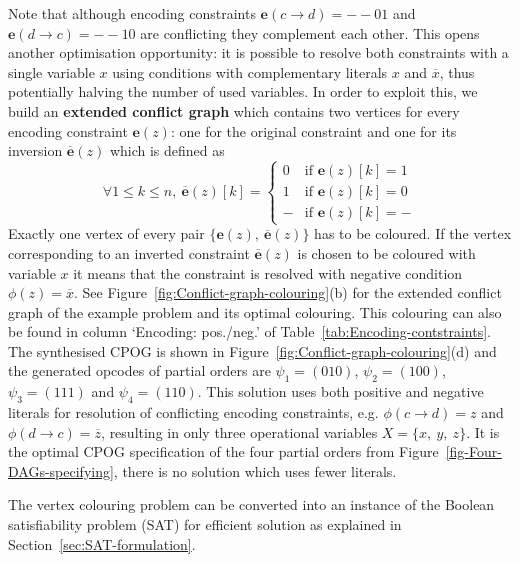 Note that although encoding constraints $\mathbf{e}(c\rightarrow d)=-\!-\!01$
and $\mathbf{e}(d\rightarrow c)=-\!-\!10$ are conflicting they complement
each other. This opens another optimisation opportunity: it is possible
to resolve both constraints with a single variable $x$ using conditions
with complementary literals $x$ and $\overline{x}$, thus potentially
halving the number of used variables. In order to exploit this, we
build an \textbf{extended conflict graph} which contains two vertices
for every encoding constraint $\mathbf{e}(z)$: one for the original
constraint and one for its inversion $\overline{\mathbf{e}}(z)$ which
is defined as
\[
\forall1\le k\le n,\ \overline{\mathbf{e}}(z)[k]=\begin{cases}
0 & \text{if }\mathbf{e}(z)[k]=1\\
1 & \text{if }\mathbf{e}(z)[k]=0\\
- & \text{if }\mathbf{e}(z)[k]=-
\end{cases}
\]
Exactly one vertex of every pair $\{\mathbf{e}(z),\ \overline{\mathbf{e}}(z)\}$
has to be coloured. If the vertex corresponding to an inverted constraint
$\overline{\mathbf{e}}(z)$ is chosen to be coloured with variable
$x$ it means that the constraint is resolved with negative condition
$\phi(z)=\overline{x}$. See Figure~\ref{fig:Conflict-graph-colouring}(b)
for the extended conflict graph of the example problem and its optimal
colouring. This colouring can also be found in column `Encoding:
pos./neg.' of Table~\ref{tab:Encoding-contstraints}. The synthesised
CPOG is shown in Figure~\ref{fig:Conflict-graph-colouring}(d) and
the generated opcodes of partial orders are $\psi_{1}=(010)$, $\psi_{2}=(100)$,
$\psi_{3}=(111)$ and $\psi_{4}=(110)$. This solution uses both positive
and negative literals for resolution of conflicting encoding constraints,
e.g. $\phi(c\rightarrow d)=z$ and $\phi(d\rightarrow c)=\overline{z}$,
resulting in only three operational variables $X=\{x,\ y,\ z\}$.
It is the optimal CPOG specification of the four partial orders from
Figure~\ref{fig-Four-DAGs-specifying}, there is no solution which
uses fewer literals.

The vertex colouring problem can be converted into an instance of
the Boolean satisfiability problem (SAT) for efficient solution as
explained in Section~\ref{sec:SAT-formulation}.

